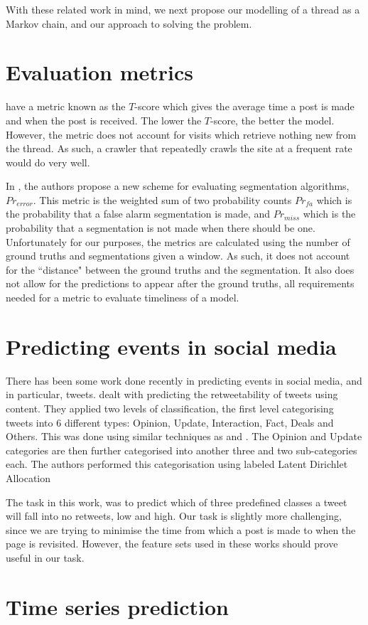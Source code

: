 
With these related work in mind, we next propose our modelling of a thread as a 
Markov chain, and our approach to solving the problem.


\section{Evaluation metrics}
 have a metric known as the $T$-score which gives the average 
time a post is made and when the post is received. The lower the $T$-score, the 
better the model. However, the metric does not account for visits which retrieve 
nothing new from the thread.  As such, a crawler that repeatedly crawls the site 
at a frequent rate would do very well.

In , the authors propose a new scheme for evaluating 
segmentation algorithms, $Pr_{error}$. This metric is the weighted sum of two 
probability counts $Pr_{fa}$ which is the probability that a false alarm 
segmentation is made, and $Pr_{miss}$ which is the probability that a 
segmentation is not made when there should be one. Unfortunately for our 
purposes, the metrics are calculated using the number of ground truths and 
segmentations given a window. As such, it does not account for the ``distance" 
between the ground truths and the segmentation. It also does not allow for the 
predictions to appear after the ground truths, all requirements needed for a 
metric to evaluate timeliness of a model.

\section{Predicting events in social media}
There has been some work done recently in predicting events in social media, and 
in particular, tweets. 
 dealt with predicting the retweetability of tweets using 
content. They applied two levels of classification, the first level categorising 
tweets into 6 different types: Opinion, Update, Interaction, Fact, Deals and 
Others. This was done using similar techniques as  and 
. The Opinion and Update categories are then further 
categorised into another three and two sub-categories each. The authors 
performed this categorisation using labeled Latent Dirichlet Allocation 

The task in this work, was to predict which of three predefined classes a tweet 
will fall into no retweets, low and high. Our task is slightly more challenging, 
since we are trying to minimise the time from which a post is made to when the 
page is revisited. However, the feature sets used in these works should prove 
useful in our task.  

\section{Time series prediction}




